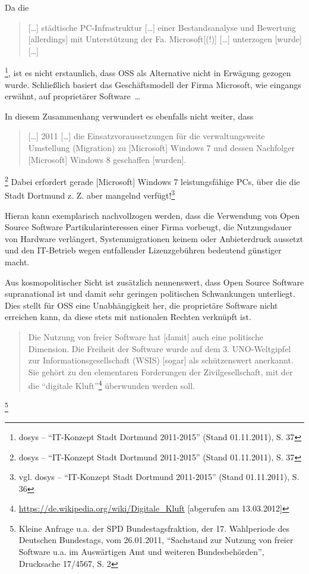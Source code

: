 \documentclass[a4paper]{scrartcl}
\begin{document}
Da die \begin{quote} [\ldots] städtische PC-Infrastruktur [{\dots}] einer
  Bestandsanalyse und Bewertung [allerdings] mit Unterstützung der
  Fa. Microsoft[(!)] [\ldots] unterzogen [wurde]
  [\ldots]\end{quote}\footnote{dosys -- ``IT-Konzept Stadt Dortmund 2011-2015''
  (Stand 01.11.2011), S. 37}, ist es nicht erstaunlich, dass OSS als Alternative
nicht in Erwägung gezogen wurde. Schließlich basiert das Geschäftsmodell der
Firma Microsoft, wie eingangs erwähnt, auf proprietärer Software~\ldots

In diesem Zusammenhang verwundert es ebenfalls nicht weiter, dass
\begin{quote} [\ldots] 2011 [\ldots] die Einsatzvoraussetzungen für die
  verwaltungsweite Umstellung (Migration) zu [Microsoft] Windows 7 und dessen
  Nachfolger [Microsoft] Windows 8 geschaffen
  [wurden].\end{quote}\footnote{dosys -- ``IT-Konzept Stadt Dortmund 2011-2015''
  (Stand 01.11.2011), S. 37} Dabei erfordert gerade [Microsoft] Windows 7
leistungsfähige PCs, über die die Stadt Dortmund z. Z. aber mangelnd
verfügt!\footnote{vgl. dosys -- ``IT-Konzept Stadt Dortmund 2011-2015'' (Stand
  01.11.2011), S. 36}

Hieran kann exemplarisch nachvollzogen werden, dass die Verwendung von Open
Source Software Partikularinteressen einer Firma vorbeugt, die Nutzungsdauer von
Hardware verlängert, Systemmigrationen keinem oder Anbieterdruck aussetzt und
den IT-Betrieb wegen entfallender Lizenzgebühren bedeutend günstiger macht.

Aus kosmopolitischer Sicht ist zusätzlich nennenswert, dass Open Source Software
supranational ist und damit sehr geringen politischen Schwankungen unterliegt.
Dies stellt für OSS eine Unabhängigkeit her, die proprietäre Software nicht
erreichen kann, da diese stets mit nationalen Rechten verknüpft ist.

\begin{quote}Die Nutzung von freier Software hat [damit] auch eine politische
  Dimension. Die Freiheit der Software wurde auf dem 3.  UNO-Weltgipfel zur
  Informationsgesellschaft (WSIS) [sogar] als schützenswert anerkannt. Sie
  gehört zu den elementaren Forderungen der Zivilgesellschaft, mit der die
  ``digitale Kluft''\footnote{\url{https://de.wikipedia.org/wiki/Digitale_Kluft}
    [abgerufen am 13.03.2012]} überwunden werden
  soll.\end{quote}\footnote{Kleine Anfrage u.a. der SPD Bundestagsfraktion, der
  17. Wahlperiode des Deutschen Bundestags, vom 26.01.2011, ``Sachstand zur
  Nutzung von freier Software u.a. im Auswärtigen Amt und weiteren
  Bundesbehörden'', Drucksache 17/4567, S. 2}
\end{document}
